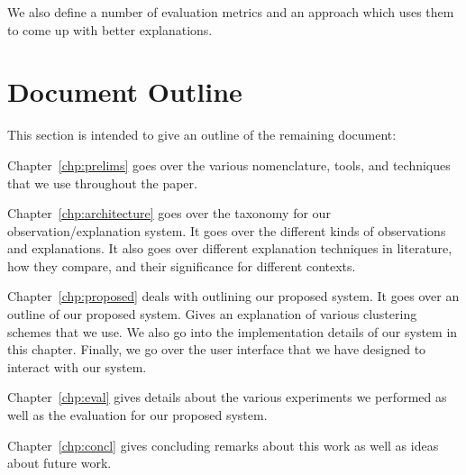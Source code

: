 We also define a number of evaluation metrics and an approach which uses them to come up with better explanations.

\section{Document Outline}

This section is intended to  give an outline of the remaining document:


Chapter~\ref{chp:prelims} goes over the various nomenclature, tools, and techniques that we use throughout the paper.

Chapter~\ref{chp:architecture} goes over the taxonomy for our observation/explanation system. It goes over the different kinds of observations and explanations. It also goes over different explanation techniques in literature, how they compare, and their significance for different contexts.

Chapter~\ref{chp:proposed} deals with outlining our proposed system. It goes over an outline of our proposed system. Gives an explanation of various clustering schemes that we use. We also go into the implementation details of our system in this chapter. Finally, we go over the user interface that we have designed to interact with our system.

Chapter~\ref{chp:eval} gives details about the various experiments we performed as well as the evaluation for our proposed system.

Chapter~\ref{chp:concl} gives concluding remarks about this work as well as ideas about future work.

